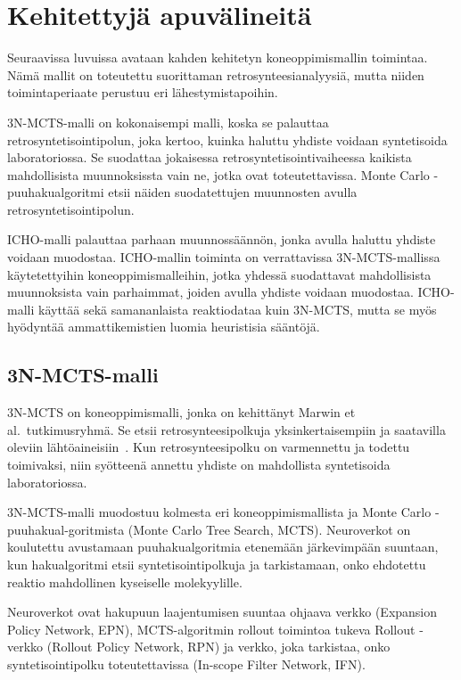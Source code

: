 \documentclass[finnish,twoside,censored,tkt,sw-line]{HYthesisML}
\begin{document}
\section{Kehitettyjä apuvälineitä}

Seuraavissa luvuissa avataan kahden kehitetyn koneoppimismallin toimintaa.
Nämä mallit on toteutettu suorittaman retrosynteesianalyysiä, mutta niiden toimintaperiaate perustuu eri lähestymistapoihin.

3N-MCTS-malli on kokonaisempi malli, koska se palauttaa retrosyntetisointipolun, joka kertoo, kuinka haluttu yhdiste voidaan syntetisoida laboratoriossa.
Se suodattaa jokaisessa retrosyntetisointivaiheessa kaikista mahdollisista muunnoksissta vain ne, jotka ovat toteutettavissa.
Monte Carlo -puuhakualgoritmi etsii näiden suodatettujen muunnosten avulla retrosyntetisointipolun.

ICHO-malli palauttaa parhaan muunnossäännön, jonka avulla haluttu yhdiste voidaan muodostaa.
ICHO-mallin toiminta on verrattavissa 3N-MCTS-mallissa käytetettyihin koneoppimismalleihin, jotka yhdessä suodattavat mahdollisista muunnoksista vain parhaimmat, joiden avulla yhdiste voidaan muodostaa.
ICHO-malli käyttää sekä samananlaista reaktiodataa kuin 3N-MCTS, mutta se myös hyödyntää ammattikemistien luomia heuristisia sääntöjä.

\subsection{3N-MCTS-malli}

3N-MCTS on koneoppimismalli, jonka on kehittänyt Marwin et al.\ tutkimusryhmä.
Se etsii retrosynteesipolkuja yksinkertaisempiin ja saatavilla oleviin lähtöaineisiin~\cite{SeglerMarwinHS2018Pcsw}.
Kun retrosynteesipolku on varmennettu ja todettu toimivaksi, niin syötteenä annettu yhdiste on mahdollista syntetisoida laboratoriossa.

3N-MCTS-malli muodostuu kolmesta eri koneoppimismallista ja Monte Carlo -puuhakual-goritmista (Monte Carlo Tree Search, MCTS).
Neuroverkot on koulutettu avustamaan puuhakualgoritmia etenemään järkevimpään suuntaan, kun hakualgoritmi etsii syntetisointipolkuja ja tarkistamaan, onko ehdotettu reaktio mahdollinen kyseiselle molekyylille.

Neuroverkot ovat hakupuun laajentumisen suuntaa ohjaava verkko (Expansion Policy Network, EPN), MCTS-algoritmin rollout toimintoa tukeva Rollout -verkko (Rollout Policy Network, RPN) ja verkko, joka tarkistaa, onko syntetisointipolku toteutettavissa (In-scope Filter Network, IFN).
\end{document}
